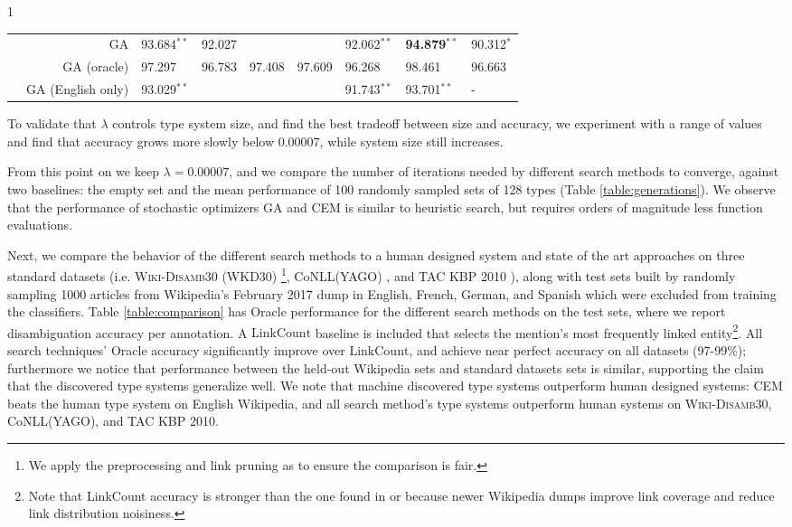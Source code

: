 \documentclass[letterpaper]{article}
\newcommand{\oneS}{\ensuremath{{}^{\textstyle *}}}
\newcommand{\twoS}{\ensuremath{{}^{\textstyle **}}}
\begin{document}
\begin{table*}[ht]
\begin{center}
\begin{subtable}{1\linewidth}
\begin{center}
\begin{tabular}{ |c|r|l|l|l|l|l|l|l|}
& GA                                                 & 93.684\twoS  & 92.027 & & & 92.062\twoS & {\bf 94.879\twoS} & 90.312\oneS\\
& GA (oracle)                                        & 97.297  & 96.783 & 97.408 & 97.609 & 96.268 & 98.461 & 96.663\\
& GA (English only)                                  & 93.029\twoS & & & & 91.743\twoS & 93.701\twoS & - \\
\hline
\end{tabular}
\end{center}
\label{table:comparison}
    \end{subtable}
    \end{center}
\end{table*}


To validate that $\lambda$ controls type system size, and find the best tradeoff between size and accuracy, we experiment with a range of values and find that accuracy grows more slowly below 0.00007, while system size still increases.


From this point on we keep $\lambda=0.00007$, and we compare the number of iterations needed by different search methods to converge, against two baselines: the empty set and the mean performance of 100 randomly sampled sets of 128 types (Table \ref{table:generations}). We observe that the performance of stochastic optimizers GA and CEM is similar to heuristic search, but requires orders of magnitude less function evaluations.

Next, we compare the behavior of the different search methods to a human designed system and state of the art approaches on three standard datasets (i.e. \textsc{Wiki-Disamb30} (WKD30) \cite{tagme}\footnote{We apply the preprocessing and link pruning as  \cite{tagme} to ensure the comparison is fair.}, CoNLL(YAGO) \cite{AIDA2011}, and TAC KBP 2010 \cite{ji2010overview}), along with test sets built by randomly sampling 1000 articles from Wikipedia's February 2017 dump in English, French, German, and Spanish which were excluded from training the classifiers. Table \ref{table:comparison} has Oracle performance for the different search methods on the test sets, where we report disambiguation accuracy per annotation. A $\mathrm{LinkCount}$ baseline is included that selects the mention's most frequently linked entity\footnote{Note that LinkCount accuracy is stronger than the one found in \cite{tagme} or \cite{milne2008learning} because newer Wikipedia dumps improve link coverage and reduce link distribution noisiness.}. All search techniques' Oracle accuracy significantly improve over $\mathrm{LinkCount}$, and achieve near perfect accuracy on all datasets (97-99\%); furthermore we notice that performance between the held-out Wikipedia sets and standard datasets sets is similar, supporting the claim that the discovered type systems generalize well. We note that machine discovered type systems outperform human designed systems: CEM beats the human type system on English Wikipedia, and all search method's type systems outperform human systems on \textsc{Wiki-Disamb30}, CoNLL(YAGO), and TAC KBP 2010.
\end{document}
